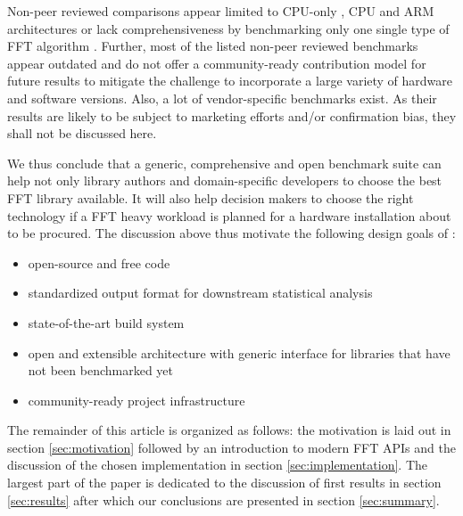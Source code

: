 Non-peer reviewed comparisons appear limited to CPU-only \citep{benchFFT}, CPU and ARM architectures \citep{roy_longbottom} or lack comprehensiveness by benchmarking only one single type of FFT algorithm \citep{fft_check}. Further, most of the listed non-peer reviewed benchmarks appear outdated and do not offer a community-ready contribution model for future results to mitigate the challenge to incorporate a large variety of hardware and software versions. Also, a lot of vendor-specific benchmarks exist. As their results are likely to be subject to marketing efforts and/or confirmation bias, they shall not be discussed here.

We thus conclude that a generic, comprehensive and open benchmark suite can help not only library authors and domain-specific developers to choose the best FFT library available. It will also help decision makers to choose the right technology if a FFT heavy workload is planned for a hardware installation about to be procured. The discussion above thus motivate the following design goals of \gearshifft{}:

\begin{itemize}
\item open-source and free code
\item standardized output format for downstream statistical analysis
\item state-of-the-art build system
\item open and extensible architecture with generic interface for libraries that have not been benchmarked yet
\item community-ready project infrastructure
\end{itemize}

The remainder of this article is organized as follows: the motivation is laid out in section \ref{sec:motivation} followed by an introduction to modern FFT APIs and the discussion of the chosen implementation in section \ref{sec:implementation}. The largest part of the paper is dedicated to the discussion of first results in section \ref{sec:results} after which our conclusions are presented in section \ref{sec:summary}.

